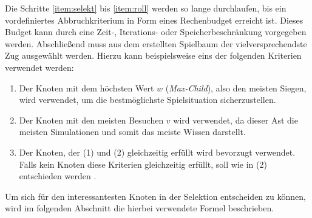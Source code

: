 \documentclass[12pt,a4paper,bibliography=totocnumbered,listof=totocnumbered]{article}
\begin{document}
Die Schritte \ref{item:selekt} bis \ref{item:roll} werden so lange durchlaufen, bis ein vordefiniertes Abbruchkriterium in Form eines Rechenbudget erreicht ist. Dieses Budget kann durch eine Zeit-, Iterations- oder Speicherbeschränkung vorgegeben werden. Abschließend muss aus dem erstellten Spielbaum der vielversprechendste Zug ausgewählt werden. Hierzu kann beispielsweise eins der folgenden Kriterien verwendet werden:
\begin{enumerate}
\item Der Knoten mit dem höchsten Wert $w$ (\emph{Max-Child}), also den meisten Siegen,  wird verwendet, um die bestmöglichste Spielsituation sicherzustellen.
\item Der Knoten mit den meisten Besuchen $v$ wird verwendet, da dieser Ast die meisten Simulationen und somit das meiste Wissen darstellt.
\item Der Knoten, der (1) und (2) gleichzeitig erfüllt wird bevorzugt verwendet. Falls kein Knoten diese Kriterien gleichzeitig erfüllt, soll wie in (2) entschieden werden \citep{CameronBrowne.2012}.\\
\end{enumerate}
Um sich für den interessantesten Knoten in der Selektion entscheiden zu können, wird im folgenden Abschnitt die hierbei verwendete Formel beschrieben.
\end{document}
